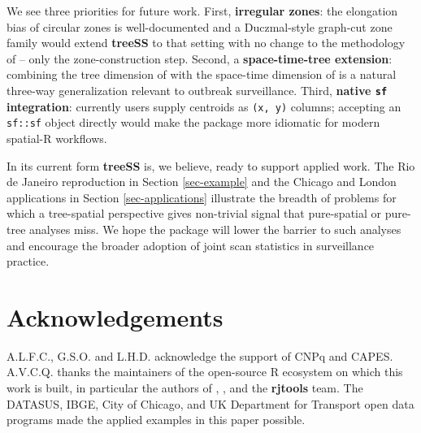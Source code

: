 We see three priorities for future work. First, \textbf{irregular zones}: the
elongation bias of circular zones is well-documented and a Duczmal-style
graph-cut zone family would extend \textbf{treeSS} to that setting with no
change to the methodology of \citet{cancado2025} -- only the
zone-construction step. Second, a \textbf{space-time-tree extension}:
combining the tree dimension of \citet{kulldorff2003} with the space-time
dimension of \citet{scanstatistics} is a natural three-way generalization
relevant to outbreak surveillance. Third, \textbf{native \texttt{sf} integration}:
currently users supply centroids as \texttt{(x,\ y)} columns; accepting an
\texttt{sf::sf} object directly would make the package more idiomatic for
modern spatial-R workflows.

In its current form \textbf{treeSS} is, we believe, ready to support applied
work. The Rio de Janeiro reproduction in Section \ref{sec-example} and
the Chicago and London applications in Section \ref{sec-applications}
illustrate the breadth of problems for which a tree-spatial perspective
gives non-trivial signal that pure-spatial or pure-tree analyses miss.
We hope the package will lower the barrier to such analyses and
encourage the broader adoption of joint scan statistics in
surveillance practice.

\hypertarget{acknowledgements}{%
\section*{Acknowledgements}\label{acknowledgements}}

A.L.F.C., G.S.O. and L.H.D. acknowledge the support of CNPq and CAPES.
A.V.C.Q. thanks the maintainers of the open-source R ecosystem on which
this work is built, in particular the authors of ,
,  and the \textbf{rjtools} team. The
DATASUS, IBGE, City of Chicago, and UK Department for Transport open data
programs made the applied examples in this paper possible.



\address{%
Allan Quadros\\
Department of Management, University of North Florida\\%
1 UNF Drive\\ Jacksonville, FL 32224, USA\\
%
\url{https://github.com/allanvc}\\%
\textit{ORCiD: \href{https://orcid.org/0000-0003-3250-5380}{0000-0003-3250-5380}}\\%
\href{mailto:allanvcq@gmail.com}{\nolinkurl{allanvcq@gmail.com}}%
}

